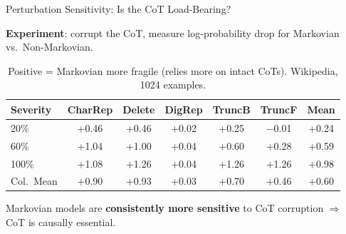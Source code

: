 \documentclass[aspectratio=169]{beamer}
\begin{document}
\begin{frame}{Perturbation Sensitivity: Is the CoT Load-Bearing?}

\textbf{Experiment}: corrupt the CoT, measure log-probability drop for Markovian vs.\ Non-Markovian.

\begin{table}
\centering
\small
\begin{tabular}{lccccc|c}
\toprule
Severity & CharRep & Delete & DigRep & TruncB & TruncF & Mean \\
\midrule
20\% & +0.46 & +0.46 & +0.02 & +0.25 & $-$0.01 & +0.24 \\
60\% & +1.04 & +1.00 & +0.04 & +0.60 & +0.28 & +0.59 \\
100\% & +1.08 & +1.26 & +0.04 & +1.26 & +1.26 & +0.98 \\
\midrule
\rowcolor{mkgreen!10}
Col.\ Mean & +0.90 & +0.93 & +0.03 & +0.70 & +0.46 & +0.60 \\
\bottomrule
\end{tabular}
\caption*{\small Positive = Markovian more fragile (relies more on intact CoTs). Wikipedia, 1024 examples.}
\end{table}

\vspace{0.2cm}
\begin{center}
Markovian models are \textbf{consistently more sensitive} to CoT corruption $\Rightarrow$ CoT is causally essential.
\end{center}
\end{frame}
\end{document}
